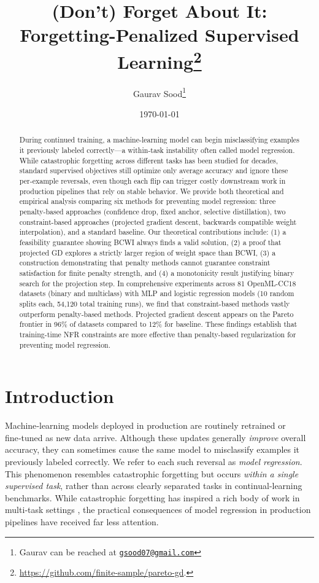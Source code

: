 \documentclass[12pt, letterpaper]{article}
\title{(Don't) Forget About It: Forgetting-Penalized Supervised Learning\thanks{\href{https://github.com/finite-sample/mw-calibration}{https://github.com/finite-sample/pareto-gd}.}}
\author{Gaurav Sood\thanks{Gaurav can be reached at \href{mailto:gsood07@gmail.com}{\footnotesize{\texttt{gsood07@gmail.com}}}}\vspace{.5cm}}
\date{\today}
\theoremstyle{remark}
\begin{document}
\maketitle

\begin{abstract}
During continued training, a machine-learning model can begin misclassifying examples it previously labeled correctly—a within-task instability often called model regression. While catastrophic forgetting across different tasks has been studied for decades, standard supervised objectives still optimize only average accuracy and ignore these per-example reversals, even though each flip can trigger costly downstream work in production pipelines that rely on stable behavior. We provide both theoretical and empirical analysis comparing six methods for preventing model regression: three penalty-based approaches (confidence drop, fixed anchor, selective distillation), two constraint-based approaches (projected gradient descent, backwards compatible weight interpolation), and a standard baseline. Our theoretical contributions include: (1) a feasibility guarantee showing BCWI always finds a valid solution, (2) a proof that projected GD explores a strictly larger region of weight space than BCWI, (3) a construction demonstrating that penalty methods cannot guarantee constraint satisfaction for finite penalty strength, and (4) a monotonicity result justifying binary search for the projection step. In comprehensive experiments across 81 OpenML-CC18 datasets (binary and multiclass) with MLP and logistic regression models (10 random splits each, 54,120 total training runs), we find that constraint-based methods vastly outperform penalty-based methods. Projected gradient descent appears on the Pareto frontier in 96\% of datasets compared to 12\% for baseline. These findings establish that training-time NFR constraints are more effective than penalty-based regularization for preventing model regression.
\end{abstract}

\section{Introduction}\label{sec:intro}

Machine‑learning models deployed in production are routinely retrained or fine‑tuned as new data arrive.  Although these updates generally \emph{improve} overall accuracy, they can sometimes cause the same model to misclassify examples it previously labeled correctly.  We refer to each such reversal as \emph{model regression}.  This phenomenon resembles catastrophic forgetting \citep{french1999catastrophic} but occurs \emph{within a single supervised task}, rather than across clearly separated tasks in continual‑learning benchmarks.  While catastrophic forgetting has inspired a rich body of work in multi‑task settings \citep{kirkpatrick2017overcoming, zenke2017continual}, the practical consequences of model regression in production pipelines have received far less attention.
\end{document}
